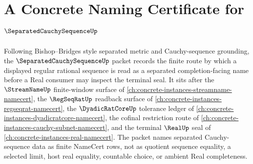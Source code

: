 \chapter{A Concrete Naming Certificate for $\SeparatedCauchySequenceUp$}
\label{ch:concrete-instances-separated-cauchy-sequence-namecert}

Following Bishop--Bridges style separated metric and Cauchy-sequence grounding, the $\SeparatedCauchySequenceUp$ packet records the finite route by which a displayed regular rational sequence is read as a separated completion-facing name before a Real consumer may inspect the terminal seal. It sits after the $\StreamNameUp$ finite-window surface of \autoref{ch:concrete-instances-streamname-namecert}, the $\RegSeqRatUp$ readback surface of \autoref{ch:concrete-instances-regseqrat-namecert}, the $\DyadicRatCoreUp$ tolerance ledger of \autoref{ch:concrete-instances-dyadicratcore-namecert}, the cofinal restriction route of \autoref{ch:concrete-instances-cauchy-subnet-namecert}, and the terminal $\RealUp$ seal of \autoref{ch:concrete-instances-real-namecert}. The packet names separated Cauchy-sequence data as finite NameCert rows, not as quotient sequence equality, a selected limit, host real equality, countable choice, or ambient Real completeness.

